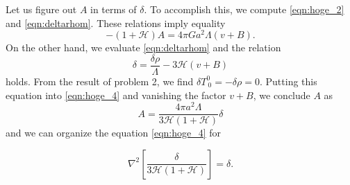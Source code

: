 \documentclass[a4paper,pdftex,10pt]{article}
\begin{document}
\begin{enumerate}
        Let us figure out $A$ in terms of $\delta$. To accomplish this, we compute \eqref{eqn:hoge_2} and \eqref{eqn:deltarhom}. These relations imply equality
        \begin{equation}
          -(1+\mathcal{H})A
          =
          4\pi Ga^2 \Lambda(v+B)
          .
          \label{eqn:hoge_4}
        \end{equation}
        On the other hand, we evaluate \eqref{eqn:deltarhom} and the relation
        \begin{equation}
          \delta
          =
          \frac{\delta \rho}{\Lambda}-3\mathcal{H}(v+B)
        \end{equation}
        holds. From the result of problem 2, we find $\delta T^{0}_{\ 0}=-\delta \rho=0$. Putting this equation into \eqref{eqn:hoge_4} and vanishing the factor $v+B$, we conclude $A$ as 
        \begin{equation}
          A
          =
          \frac{4\pi a^2 \Lambda}{3\mathcal{H}(1+\mathcal{H})}\delta
        \end{equation}
        and we can organize the equation \eqref{eqn:hoge_4} for
        \begin{graybox}
          \vspace*{-5pt}
          \begin{equation}
            \nabla^2
            \left[ \frac{\delta}{3\mathcal{H}(1+\mathcal{H})} \right]
            =
            \delta
            .
          \end{equation}
        \end{graybox}

\end{enumerate}
\end{document}
